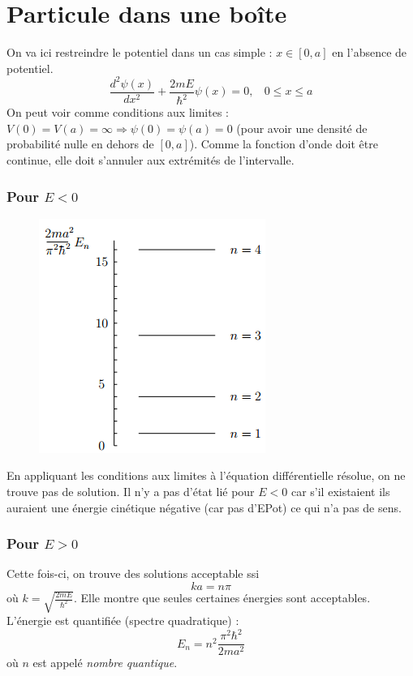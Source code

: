 \documentclass[british,french,11pt, a4paper, openany]{book}
\begin{document}
	\section{Particule dans une boîte}
	On va ici restreindre le potentiel dans un cas simple : $x \in [0,a]$ en l'absence de potentiel.
	\begin{equation}
		\frac{d^2\psi(x)}{dx^2} + \frac{2mE}{\hbar^2}\psi(x) = 0, \ \ \ \ 0\leq x \leq a
	\end{equation}
	On peut voir comme conditions aux limites : $V(0) = V(a) = \infty \Rightarrow \psi(0) = \psi(a) = 0$ (pour avoir une densité de probabilité nulle en dehors de $[0,a]$). Comme la fonction d'onde doit être continue, elle doit s'annuler aux extrémités de l'intervalle.
	
	\subsubsection*{Pour $E < 0$}
	\begin{figure}
		\includegraphics[scale=0.5]{img/image4.png}
	\end{figure}
	En appliquant les conditions aux limites à l'équation différentielle résolue, on ne trouve pas de solution. Il n'y a pas d'état lié pour $E < 0$ car s'il existaient ils auraient une énergie cinétique négative (car pas d'EPot) ce qui n'a pas de sens.
	
	\subsubsection*{Pour $E > 0$}
	Cette fois-ci, on trouve des solutions acceptable ssi
	\begin{equation}
		ka = n\pi
	\end{equation}
	où $k = \sqrt{\frac{2mE}{\hbar^2}}$. Elle montre que seules certaines énergies sont acceptables. L'énergie est quantifiée (spectre quadratique) :
	\begin{equation}
		E_n = n^2 \frac{\pi^2\hbar^2}{2ma^2}
	\end{equation}
	où $n$ est appelé \textit{nombre quantique}.\\
	
\end{document}
